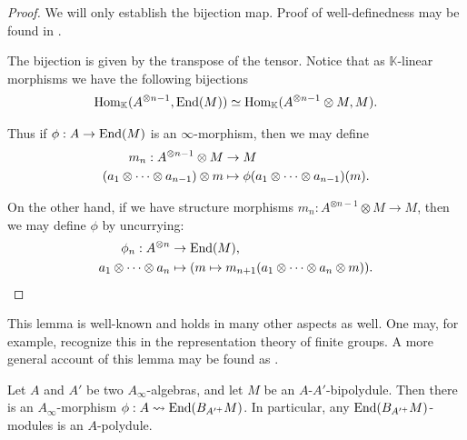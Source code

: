 \documentclass[../thesis.tex]{subfiles}
\begin{document}
            \begin{proof}
                We will only establish the bijection map. Proof of well-definedness may be found in \cite{LefevreHasegawa03}.
                
                The bijection is given by the transpose of the tensor. Notice that as $\mathbb{K}$-linear morphisms we have the following bijections
                \begin{align*}
                    \tt{Hom}_\mathbb{K}(A^{\otimes n-1}, \tt{End}(M)) \simeq \tt{Hom}_{\mathbb{K}}(A^{\otimes n-1}\otimes M, M)\tt{.}
                \end{align*}

                Thus if $\phi : A \rightarrow \tt{End}(M)$ is an $\infty$-morphism, then we may define
                \begin{align*}
                    m_n : A^{\otimes n-1} \otimes M & \rightarrow M \\
                    (a_1 \otimes \cdots \otimes a_{n-1})\otimes m & \mapsto \phi(a_1\otimes\cdots\otimes a_{n-1})(m)\tt{.}
                \end{align*}

                On the other hand, if we have structure morphisms $m_n : A^{\otimes n-1}\otimes M \rightarrow M$, then we may define $\phi$ by uncurrying:
                \begin{align*}
                    \phi_n : A^{\otimes n} & \rightarrow \tt{End}(M)\tt{,} \\
                    a_1 \otimes \cdots \otimes a_n & \mapsto (m \mapsto m_{n+1}(a_1 \otimes \cdots \otimes a_n \otimes m))\tt{.}
                \end{align*}
            \end{proof}

            \begin{remark}
                This lemma is well-known and holds in many other aspects as well. One may, for example, recognize this in the representation theory of finite groups. A more general account of this lemma may be found as \cite[Proposition 5.2.2.][139]{Loday12}.
            \end{remark}

            \begin{corollary}
                Let $A$ and $A'$ be two $A_\infty$-algebras, and let $M$ be an $A$-$A'$-bipolydule. Then there is an $A_\infty$-morphism $\phi : A \rightsquigarrow \tt{End}(B_{A'^+}M)$. In particular, any $\tt{End}(B_{A'^+}M)$-modules is an $A$-polydule.
            \end{corollary}
\end{document}
